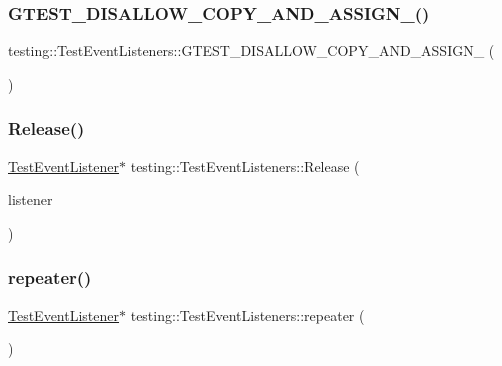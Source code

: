 \subsubsection{\texorpdfstring{G\+T\+E\+S\+T\+\_\+\+D\+I\+S\+A\+L\+L\+O\+W\+\_\+\+C\+O\+P\+Y\+\_\+\+A\+N\+D\+\_\+\+A\+S\+S\+I\+G\+N\+\_\+()}{GTEST\_DISALLOW\_COPY\_AND\_ASSIGN\_()}}
{\footnotesize\ttfamily testing\+::\+Test\+Event\+Listeners\+::\+G\+T\+E\+S\+T\+\_\+\+D\+I\+S\+A\+L\+L\+O\+W\+\_\+\+C\+O\+P\+Y\+\_\+\+A\+N\+D\+\_\+\+A\+S\+S\+I\+G\+N\+\_\+ (\begin{DoxyParamCaption}\item[{\hyperlink{classtesting_1_1TestEventListeners}{Test\+Event\+Listeners}}]{ }\end{DoxyParamCaption})\hspace{0.3cm}{\ttfamily [private]}}

\mbox{\label{classtesting_1_1TestEventListeners_a5d4bfb7d8584801d6074bb0ec28f8bda}} 
\subsubsection{\texorpdfstring{Release()}{Release()}}
{\footnotesize\ttfamily \hyperlink{classtesting_1_1TestEventListener}{Test\+Event\+Listener}$\ast$ testing\+::\+Test\+Event\+Listeners\+::\+Release (\begin{DoxyParamCaption}\item[{\hyperlink{classtesting_1_1TestEventListener}{Test\+Event\+Listener} $\ast$}]{listener }\end{DoxyParamCaption})}

\mbox{\label{classtesting_1_1TestEventListeners_a3de1e101514bdba3e74b93adc604e9c4}} 
\subsubsection{\texorpdfstring{repeater()}{repeater()}}
{\footnotesize\ttfamily \hyperlink{classtesting_1_1TestEventListener}{Test\+Event\+Listener}$\ast$ testing\+::\+Test\+Event\+Listeners\+::repeater (\begin{DoxyParamCaption}{ }\end{DoxyParamCaption})\hspace{0.3cm}{\ttfamily [private]}}

